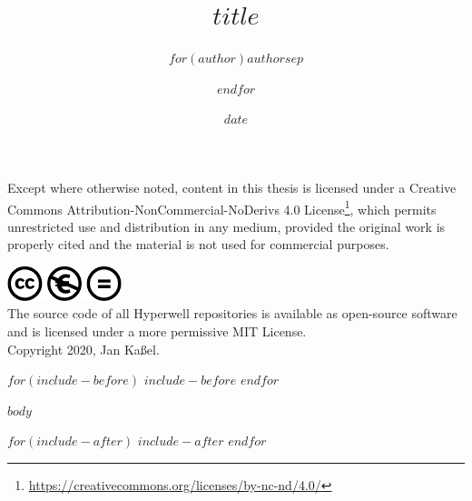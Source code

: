 \documentclass[11pt,a4paper,twoside]{book}
\date{$date$}
\author{$for(author)$$author$$sep$ \and $endfor$}
\title{$title$}
\begin{document}
\maketitle

\pagebreak




Except where otherwise noted, content in this thesis is licensed under a Creative Commons Attribution-NonCommercial-NoDerivs 4.0 License\footnote{\url{https://creativecommons.org/licenses/by-nc-nd/4.0/}}, which permits unrestricted use and distribution in any medium, provided the original work is properly cited and the material is not used for commercial purposes.

\vspace{2mm}
\includegraphics[width=0.25\textwidth]{layout/cc-nc-nd.pdf} \\

The source code of all Hyperwell repositories is available as open-source software and is licensed under a more permissive MIT License. \\

Copyright 2020, Jan Kaßel.

\pagebreak


\tableofcontents

$for(include-before)$
  $include-before$
$endfor$

$body$

$for(include-after)$
  $include-after$
$endfor$
\end{document}
